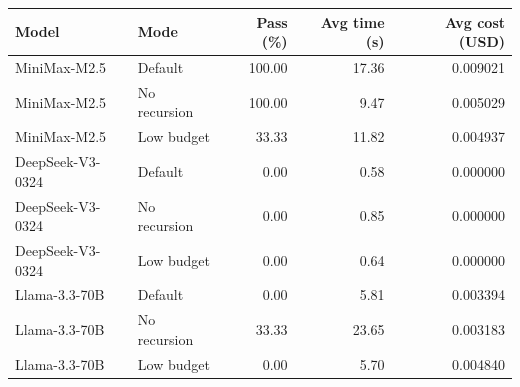 \begin{tabular}{llrrr}
\toprule
Model & Mode & Pass (\%) & Avg time (s) & Avg cost (USD) \\
\midrule
MiniMax-M2.5 & Default & 100.00 & 17.36 & 0.009021 \\
MiniMax-M2.5 & No recursion & 100.00 & 9.47 & 0.005029 \\
MiniMax-M2.5 & Low budget & 33.33 & 11.82 & 0.004937 \\
DeepSeek-V3-0324 & Default & 0.00 & 0.58 & 0.000000 \\
DeepSeek-V3-0324 & No recursion & 0.00 & 0.85 & 0.000000 \\
DeepSeek-V3-0324 & Low budget & 0.00 & 0.64 & 0.000000 \\
Llama-3.3-70B & Default & 0.00 & 5.81 & 0.003394 \\
Llama-3.3-70B & No recursion & 33.33 & 23.65 & 0.003183 \\
Llama-3.3-70B & Low budget & 0.00 & 5.70 & 0.004840 \\
\bottomrule
\end{tabular}
